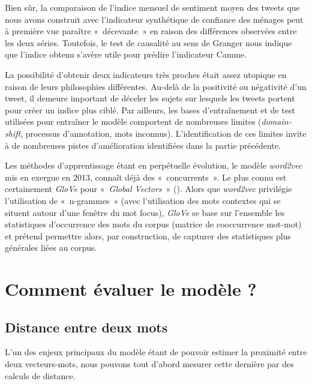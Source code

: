 \documentclass[11pt,french,french]{article}
\begin{document}
Bien sûr, la comparaison de l'indice mensuel de sentiment moyen des tweets que nous avons construit avec l'indicateur synthétique de confiance des ménages peut à première vue paraître «~décevante~» en raison des différences observées entre les deux séries.
Toutefois, le test de causalité au sens de Granger nous indique que l'indice obtenu s'avère utile pour prédire l'indicateur Camme.

La possibilité d'obtenir deux indicateurs très proches était assez utopique en raison de leurs philosophies différentes.
Au-delà de la positivité ou négativité d'un tweet, il demeure important de déceler les sujets sur lesquels les tweets portent pour créer un indice plus ciblé.
Par ailleurs, les bases d'entraînement et de test utilisées pour entraîner le modèle comportent de nombreuses limites (\emph{domain-shift}, processus d'annotation, mots inconnus).
L'identification de ces limites invite à de nombreuses pistes d'amélioration identifiées dans la partie précédente.

Les méthodes d'apprentissage étant en perpétuelle évolution, le modèle \emph{word2vec} mis en exergue en 2013, connaît déjà des «~concurrents~». Le plus connu est certainement \emph{GloVe} pour «~\emph{Global Vectors}~» (\cite{Pennington}).
Alors que \emph{word2vec} privilégie l'utilisation de «~n-grammes~» (avec l'utilisation des mots contextes qui se situent autour d'une fenêtre du mot focus), \emph{GloVe} se base sur l'ensemble les statistiques d'occurrence des mots du corpus (matrice de cooccurrence mot-mot) et prétend permettre alors, par construction, de capturer des statistiques plus générales liées au corpus.

\newpage

\hypertarget{appendix-appendix}{%
\appendix}



\hypertarget{annexe:commentEvaluer}{%
\section{Comment évaluer le modèle ?}\label{annexe:commentEvaluer}}

\hypertarget{distance-entre-deux-mots}{%
\subsection{Distance entre deux mots}\label{distance-entre-deux-mots}}

L'un des enjeux principaux du modèle étant de pouvoir estimer la proximité entre deux vecteurs-mots, nous pouvons tout d'abord mesurer cette dernière par des calculs de distance.
\end{document}
